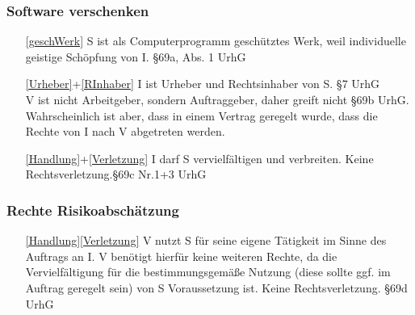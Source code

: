 \documentclass{scrreprt}
\begin{document}
\subsubsection*{Software verschenken}
\begin{enumerate}
\item[\ref{geschWerk}] S ist als Computerprogramm geschütztes Werk, weil individuelle geistige Schöpfung von I. \hfill §69a, Abs. 1 UrhG
\item[\ref{Urheber}+\ref{RInhaber}] I ist Urheber und Rechtsinhaber von S. \hfill §7 UrhG\\
V ist nicht Arbeitgeber, sondern Auftraggeber, daher greift nicht §69b UrhG.\\
Wahrscheinlich ist aber, dass in einem Vertrag geregelt wurde, dass die Rechte von I nach V abgetreten werden.
\item[\ref{Handlung}+\ref{Verletzung}] I darf S vervielfältigen und verbreiten. Keine Rechtsverletzung.\hfill §69c Nr.1+3 UrhG 
\end{enumerate}
\subsubsection*{Rechte Risikoabschätzung}
\begin{enumerate}
\item[\ref{Handlung}\ref{Verletzung}] V nutzt S für seine eigene Tätigkeit im Sinne des Auftrags an I. V benötigt hierfür keine weiteren Rechte, da die Vervielfältigung für die bestimmungsgemäße Nutzung (diese sollte ggf. im Auftrag geregelt sein) von S Voraussetzung ist. Keine Rechtsverletzung. \hfill §69d UrhG
\end{enumerate}
\end{document}

